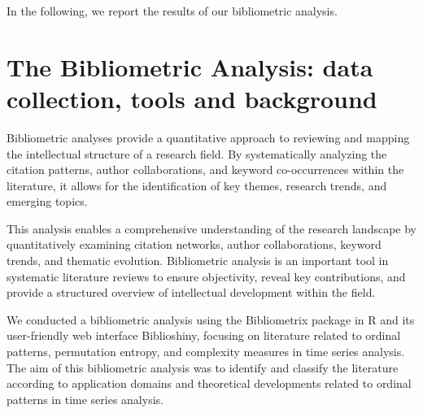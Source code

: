 In the following, we report the results of our bibliometric analysis.


\section{The Bibliometric Analysis: data collection, tools and background}\label{Sec:BiblioIntro}

Bibliometric analyses provide a quantitative approach to reviewing and mapping the intellectual structure of a research field. 
By systematically analyzing the citation patterns, author collaborations, and keyword co-occurrences within the literature, it allows for the identification of key themes, research trends, and emerging topics. 

This analysis enables a comprehensive understanding of the research landscape by quantitatively examining citation networks, author collaborations, keyword trends, and thematic evolution. 
Bibliometric analysis is an important tool in systematic literature reviews to ensure objectivity, reveal key contributions, and provide a structured overview of intellectual development within the field.

We conducted a bibliometric analysis using the Bibliometrix package in R and its user-friendly web interface Biblioshiny, focusing on literature related to ordinal patterns, permutation entropy, and complexity measures in time series analysis.
The aim of this bibliometric analysis was to identify and classify the literature according to application domains and theoretical developments related to ordinal patterns in time series analysis. 

